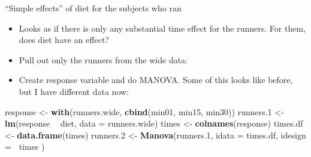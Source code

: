 \documentclass[ignorenonframetext,]{beamer}
\newenvironment{Shaded}{\begin{snugshade}}{\end{snugshade}}
\newcommand{\DataTypeTok}[1]{\textcolor[rgb]{0.13,0.29,0.53}{#1}}
\newcommand{\FloatTok}[1]{\textcolor[rgb]{0.00,0.00,0.81}{#1}}
\newcommand{\KeywordTok}[1]{\textcolor[rgb]{0.13,0.29,0.53}{\textbf{#1}}}
\newcommand{\NormalTok}[1]{#1}
\newcommand{\OperatorTok}[1]{\textcolor[rgb]{0.81,0.36,0.00}{\textbf{#1}}}
\newcommand{\StringTok}[1]{\textcolor[rgb]{0.31,0.60,0.02}{#1}}
\providecommand{\tightlist}{%
  \setlength{\itemsep}{0pt}\setlength{\parskip}{0pt}}
\begin{document}
\begin{frame}[fragile]{``Simple effects'' of diet for the subjects who
ran}
\protect\hypertarget{simple-effects-of-diet-for-the-subjects-who-ran}{}

\begin{itemize}
\item
  Looks as if there is only any substantial time effect for the runners.
  For them, does diet have an effect?
\item
  Pull out only the runners from the wide data:
\end{itemize}

\begin{Shaded}
\end{Shaded}

\begin{itemize}
\tightlist
\item
  Create response variable and do MANOVA. Some of this looks like
  before, but I have different data now:
\end{itemize}

\begin{Shaded}
\begin{Highlighting}[]
\NormalTok{response <-}\StringTok{ }\KeywordTok{with}\NormalTok{(runners.wide, }\KeywordTok{cbind}\NormalTok{(min01, min15, min30))}
\NormalTok{runners}\FloatTok{.1}\NormalTok{ <-}\StringTok{ }\KeywordTok{lm}\NormalTok{(response }\OperatorTok{~}\StringTok{ }\NormalTok{diet, }\DataTypeTok{data =}\NormalTok{ runners.wide)}
\NormalTok{times <-}\StringTok{ }\KeywordTok{colnames}\NormalTok{(response)}
\NormalTok{times.df <-}\StringTok{ }\KeywordTok{data.frame}\NormalTok{(times)}
\NormalTok{runners}\FloatTok{.2}\NormalTok{ <-}\StringTok{ }\KeywordTok{Manova}\NormalTok{(runners}\FloatTok{.1}\NormalTok{,}
  \DataTypeTok{idata =}\NormalTok{ times.df,}
  \DataTypeTok{idesign =} \OperatorTok{~}\NormalTok{times}
\NormalTok{)}
\end{Highlighting}
\end{Shaded}

\end{frame}
\end{document}
